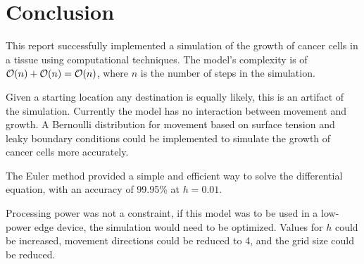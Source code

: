 \chapter{Conclusion}

This report successfully implemented a simulation of the growth of cancer cells in a tissue using computational techniques.
The model's complexity is of $\mathcal{O}(n) + \mathcal{O}(n) = \mathcal{O}(n)$, where $n$ is the number of steps in the simulation.

Given a starting location any destination is equally likely, this is an artifact of the simulation.
Currently the model has no interaction between movement and growth.
A Bernoulli distribution for movement based on surface tension and leaky boundary conditions could be implemented to simulate the growth of cancer cells more accurately.

The Euler method provided a simple and efficient way to solve the differential equation, with an accuracy of 99.95\% at $h = 0.01$.

Processing power was not a constraint, if this model was to be used in a low-power edge device, the simulation would need to be optimized.
Values for $h$ could be increased, movement directions could be reduced to 4, and the grid size could be reduced.

